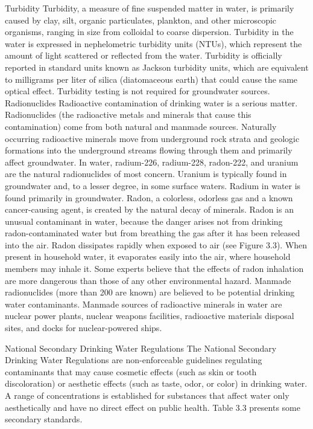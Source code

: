 \documentclass{article}
\begin{document}
Turbidity Turbidity, a measure of fine suspended matter in water, is
primarily caused by clay, silt, organic particulates, plankton, and
other microscopic organisms, ranging in size from colloidal to coarse
dispersion. Turbidity in the water is expressed in nephelometric
turbidity units (NTUs), which represent the amount of light scattered or
reflected from the water. Turbidity is officially reported in standard
units known as Jackson turbidity units, which are equivalent to
milligrams per liter of silica (diatomaceous earth) that could cause the
same optical effect. Turbidity testing is not required for groundwater
sources. Radionuclides Radioactive contamination of drinking water is a
serious matter. Radionuclides (the radioactive metals and minerals that
cause this contamination) come from both natural and manmade sources.
Naturally occurring radioactive minerals move from underground rock
strata and geologic formations into the underground streams flowing
through them and primarily affect groundwater. In water, radium-226,
radium-228, radon-222, and uranium are the natural radionuclides of most
concern. Uranium is typically found in groundwater and, to a lesser
degree, in some surface waters. Radium in water is found primarily in
groundwater. Radon, a colorless, odorless gas and a known cancer-causing
agent, is created by the natural decay of minerals. Radon is an unusual
contaminant in water, because the danger arises not from drinking
radon-contaminated water but from breathing the gas after it has been
released into the air. Radon dissipates rapidly when exposed to air (see
Figure 3.3). When present in household water, it evaporates easily into
the air, where household members may inhale it. Some experts believe
that the effects of radon inhalation are more dangerous than those of
any other environmental hazard. Manmade radionuclides (more than 200 are
known) are believed to be potential drinking water contaminants. Manmade
sources of radioactive minerals in water are nuclear power plants,
nuclear weapons facilities, radioactive materials disposal sites, and
docks for nuclear-powered ships.

National Secondary Drinking Water Regulations The National Secondary
Drinking Water Regulations are non-enforceable guidelines regulating
contaminants that may cause cosmetic effects (such as skin or tooth
discoloration) or aesthetic effects (such as taste, odor, or color) in
drinking water. A range of concentrations is established for substances
that affect water only aesthetically and have no direct effect on public
health. Table 3.3 presents some secondary standards.
\end{document}
